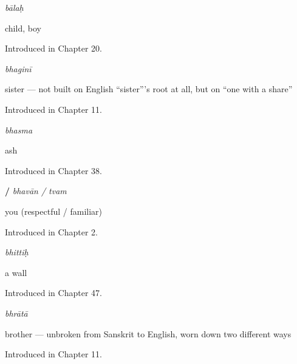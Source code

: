 \noindent\begin{minipage}[t]{\linewidth}
\raggedright
\textbf{}\enspace\emph{bālaḥ}\par
\small child, boy\par
\footnotesize Introduced in Chapter 20.
\end{minipage}\par\medskip

\noindent\begin{minipage}[t]{\linewidth}
\raggedright
\textbf{}\enspace\emph{bhaginī}\par
\small sister — not built on English \textquotedblleft{}sister\textquotedblright{}'s root at all, but on \textquotedblleft{}one with a share\textquotedblright{}\par
\footnotesize Introduced in Chapter 11.
\end{minipage}\par\medskip

\noindent\begin{minipage}[t]{\linewidth}
\raggedright
\textbf{}\enspace\emph{bhasma}\par
\small ash\par
\footnotesize Introduced in Chapter 38.
\end{minipage}\par\medskip

\noindent\begin{minipage}[t]{\linewidth}
\raggedright
\textbf{ / }\enspace\emph{bhavān / tvam}\par
\small you (respectful / familiar)\par
\footnotesize Introduced in Chapter 2.
\end{minipage}\par\medskip

\noindent\begin{minipage}[t]{\linewidth}
\raggedright
\textbf{}\enspace\emph{bhittiḥ}\par
\small a wall\par
\footnotesize Introduced in Chapter 47.
\end{minipage}\par\medskip

\noindent\begin{minipage}[t]{\linewidth}
\raggedright
\textbf{}\enspace\emph{bhrātā}\par
\small brother — unbroken from Sanskrit to English, worn down two different ways\par
\footnotesize Introduced in Chapter 11.
\end{minipage}\par\medskip

